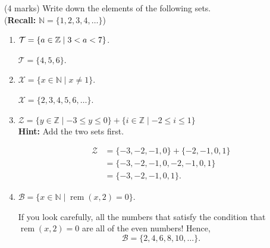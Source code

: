 \documentclass[12pt]{article} %
\begin{document}
\begin{qstn}
  (4 marks) Write down the elements of the following sets.\\
  (\textbf{Recall:} $\mathbb N = \{1,2,3,4,\dots\} $)
  \begin{enumerate}[label=(\alph*)]
    \item $\mathcal{T} = \{a \in \mathbb Z \mid 3 < a < 7\} $.
      \begin{solution}
        $\mathcal{T} = \{4,5,6\} $.
      \end{solution}

      \vspace*{3cm}



    \item $\mathcal{X} = \{x \in \mathbb N \mid x \neq 1 \} $.
      \begin{solution}
        $\mathcal{X} = \{2,3,4,5,6,\dots\} $.
      \end{solution}

      \vspace*{3cm}

    \item $\mathcal{Z} = \{y \in \mathbb Z \mid -3 \leq y \leq 0\} +  \{i \in \mathbb Z \mid -2 \leq i \leq 1\}$ \\
      \textbf{Hint:} Add the two sets first.
      \begin{solution}
        \begin{align*}
          \mathcal{Z} &= \{-3,-2,-1,0\} + \{-2,-1,0,1\}\\
                      &= \{-3,-2,-1,0,-2,-1,0,1\} \tag{Merging}\\
                      &= \{-3,-2,-1,0,1\} \tag{Removing duplicates}
        .\end{align*}
      \end{solution}

      \vspace*{1cm}

    \item $\mathcal{B} = \{x \in \mathbb N \mid \operatorname{rem}(x,2) = 0\} $.
      \begin{solution}
        If you look carefully, all the numbers that satisfy the condition that $\operatorname{rem}(x,2) = 0$ are all of the even
        numbers! Hence,
        \[
            \mathcal{B} = \{2,4,6,8,10,\dots\} 
        .\] 
      \end{solution}

  \end{enumerate}
\end{qstn}
\end{document}
